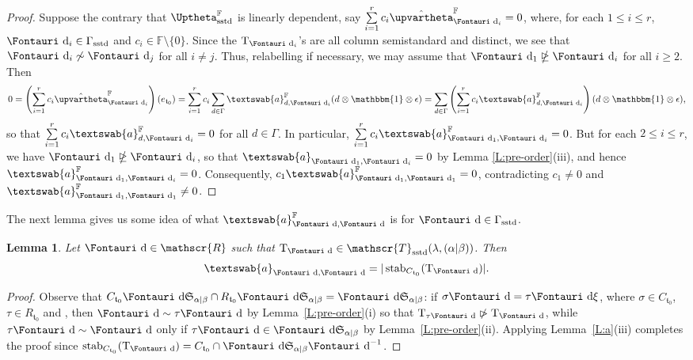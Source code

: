\documentclass[pdftex]{sigma}
\newtheorem{Lemma}[Theorem]{Lemma}
\renewcommand{\t}{\mathfrak{t}}
\renewcommand{\a}{\textswab{a}}
\newcommand{\TTS}{\mathscr{T}_\mathrm{sstd}}
\newcommand{\T}{\mathrm{T}}
\newcommand{\stab}{\operatorname{stab}}
\newcommand{\sym}[1]{\mathfrak{S}_{#1}}
\newcommand{\F}{\mathbb{F}}
\newcommand{\bb}[1]{\mathbbm{{#1}}}
\newcommand{\R}{\mathscr{R}}
\newcommand{\dR}{\text{\Fontauri d}}
\newcommand{\Jhom}{\upvartheta}
\newcommand{\hJhom}{\hat{\Jhom}}
\newcommand{\JHOM}{\Uptheta}
\newcommand{\hJHOM}{{\JHOM}}
\begin{document}
\begin{proof}
	Suppose the contrary that $\hJHOM_{\mathrm{sstd}}^{\F}$ is linearly dependent, say $\sum\limits_{i=1}^r c_i \hJhom^{\F}_{\dR_i} = 0$, where, for each $1 \leq i \leq r$, $\dR_i \in \Gamma_{\mathrm{sstd}}$ and $c_i \in \F \setminus \{0\}$. Since the $\T_{\dR_i}$'s are all column semistandard and distinct, we see that $\dR_i \not\sim \dR_j$ for all $i \ne j$. Thus, relabelling if necessary, we may assume that $\dR_1 \ntrianglerighteq \dR_i$ for all $i \geq 2$. Then
	\begin{gather*}
	0 = \left (\sum _{i=1}^r c_i \hJhom^{\F}_{\dR_i}\right )(e_{\t_0} ) =
	\sum_{i=1}^r c_i \sum_{d \in \Gamma} \a^{\F}_{d,\dR_i} (d \otimes \bb{1} \otimes \epsilon) =
	\sum_{d \in \Gamma} \left (\sum_{i=1}^r c_i \a^{\F}_{d,\dR_i}\right ) (d \otimes \bb{1} \otimes \epsilon),
	\end{gather*}
	so that $\sum\limits_{i=1}^r c_i \a^{\F}_{d,\dR_i} = 0$ for all $d \in \Gamma$. In particular, $\sum\limits_{i=1}^r c_i \a^{\F}_{\dR_1,\dR_i} = 0$. But for each $2 \leq i \leq r$, we have $\dR_1 \ntrianglerighteq \dR_i$, so that $\a_{\dR_1,\dR_i} = 0$ by Lemma \ref{L:pre-order}(iii), and hence $\a^{\F}_{\dR_1,\dR_i} = 0$. Consequently, $c_1 \a^{\F}_{\dR_1,\dR_1} = 0$, contradicting $c_1 \ne 0$ and $\a^{\F}_{\dR_1,\dR_1} \ne 0$.
\end{proof}

The next lemma gives us some idea of what $\a_{\dR,\dR}^{\F}$ is for $\dR \in \Gamma_{\mathrm{sstd}}$.

\begin{Lemma} \label{L:a_[d,d]}
Let $\dR \in \R$ such that $\T_\dR \in \TTS(\lambda,(\alpha|\beta))$. Then \begin{gather*}\a_{\dR,\dR} = |\stab_{C_{\t_0}}(\T_\dR)|.\end{gather*}
\end{Lemma}

\begin{proof}	Observe that $C_{\t_0} \dR \sym{\alpha|\beta} \cap R_{\t_0} \dR \sym{\alpha|\beta} = \dR \sym{\alpha|\beta}$: if $\sigma \dR = \tau \dR \xi$, where $\sigma \in C_{\t_0}$, $\tau \in R_{\t_0}$ and \smash{$\xi \in \sym{\alpha|\beta}$}, then $\dR \sim \tau \dR$ by Lemma~\ref{L:pre-order}(i) so that $\T_{\tau \dR}\ntriangleright \T_\dR$, while $\tau \dR \sim \dR$ only if $\tau \dR \in \dR \sym{\alpha|\beta}$ by Lemma~\ref{L:pre-order}(ii). Applying Lemma~\ref{L:a}(iii) completes the proof since $\stab_{C_{\t_0}}(\T_\dR)=C_{\t_0}\cap \dR\sym{\alpha|\beta}\dR^{-1}$.
\end{proof}
\end{document}

